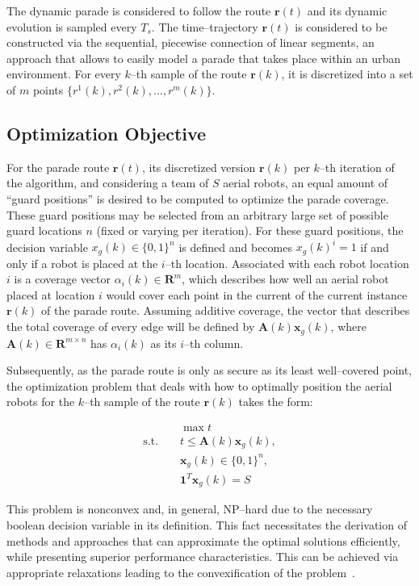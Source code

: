 \documentclass[letterpaper, 10 pt, conference]{ieeeconf}  %
\begin{document}
The dynamic parade is considered to follow the route $\mathbf{r}(t)$ and its dynamic evolution is sampled every $T_s$. The time--trajectory $\mathbf{r}(t)$ is considered to be constructed via the sequential, piecewise connection of linear segments, an approach that allows to easily model a parade that takes place within an urban environment. For every $k$--th sample of the route $\mathbf{r}(k)$, it is discretized into a set of $m$ points $\{r^1(k),r^2(k),...,r^m(k)\}$. 


\subsection{Optimization Objective}

For the parade route $\mathbf{r}(t)$, its discretized version $\mathbf{r}(k)$ per $k$--th iteration of the algorithm, and considering a team of  $S$ aerial robots, an equal amount of ``guard positions'' is desired to be computed to optimize the parade coverage. These guard positions may be selected from an arbitrary large set of possible guard locations $n$ (fixed or varying per iteration). For these guard positions, the decision variable $x_g(k) \in \{0,1\}^n$ is defined and becomes $x_g(k)^i = 1$ if and only if a robot is placed at the $i$--th location. Associated with each robot location $i$ is a coverage vector $\alpha_i(k)\in \mathbf{R}^m$, which describes how well an aerial robot placed at location $i$ would cover each point in the current of the current instance $\mathbf{r}(k)$ of the parade route. Assuming additive coverage, the vector that describes the total coverage of every edge will be defined by $\mathbf{A}(k)\mathbf{x}_g(k)$, where $\mathbf{A}(k)\in\mathbf{R}^{m\times n}$ has $\alpha_i(k)$ as its $i$--th column. 

Subsequently, as the parade route is only as secure as its least well--covered point, the optimization problem that deals with how to optimally position the aerial robots for the $k$--th sample of the route $\mathbf{r}(k)$ takes the form:

\begin{eqnarray}
 &&\max t \\ \nonumber
 \textrm{s.t.~} && t\le \mathbf{A}(k)\mathbf{x}_g(k),\\ \nonumber && \mathbf{x}_g(k)\in\{0,1\}^n, \\ \nonumber && \mathbf{1}^T\mathbf{x}_g(k)=S
\end{eqnarray}

\noindent This problem is nonconvex and, in general, NP--hard due to the necessary boolean decision variable in its definition. This fact necessitates the derivation of methods and approaches that can approximate the optimal solutions efficiently, while presenting superior performance characteristics. This can be achieved via appropriate relaxations leading to the convexification of the problem~\cite{Loefberg_ARCP,cvxbook}. 
\end{document}
